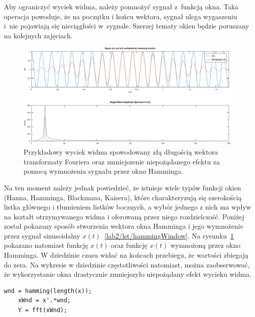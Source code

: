 Aby ograniczyć wyciek widma, należy pomnożyć sygnał z~funkcją okna. Taka operacja powoduje, że na początku i końcu wektora, sygnał ulega wygaszeniu i~nie pojawiają się nieciągłości w~sygnale. Szerzej tematy okien będzie poruszany na kolejnych zajęciach.
\begin{figure}[hbt!]
	\centering
	\includegraphics[width=0.9\linewidth]{images/spectralLeakage.png}
	\caption{Przykładowy wyciek widma spowodowany złą długością wektora transformaty Fouriera oraz zmniejszenie niepożądanego efektu za pomocą wymnożenia sygnału przez okno Hamminga.}
	\label{lab2/fig/spectralLeakage}
\end{figure}
Na ten moment należy jednak powiedzieć, że istnieje wiele typów funkcji okien (Hanna, Hamminga, Blackmana, Kaisera), które charakteryzują się szerokością listka głównego i tłumieniem listków bocznych, a wybór jednego z nich ma wpływ na kształt otrzymywanego widma i oferowaną przez niego rozdzielczość. Poniżej został pokazany sposób stworzenia wektora okna Hamminga i jego wymnożenie przez sygnał sinusoidalny $x(t)$~\ref{lab2/lst/hammingWindow}. Na rysunku~\ref{lab2/fig/spectralLeakage} pokazano natomiast funkcję $x(t)$ oraz funkcję $x(t)$ wymnożoną przez okno Hamminga. W dziedzinie czasu widać na końcach przebiegu, że wartości zbiegają do zera. Na wykresie w dziedzinie częstotliwości natomiast, można zaobserwować, że wykorzystanie okna drastycznie zmniejszyło niepożądany efekt wycieku widma.    
\begin{lstlisting}[caption=Wymnożenie sygnału $x(t)$ przez okno Hamminga , label=lab2/lst/hammingWindow]
	wnd = hamming(length(x));
	xWnd = x'.*wnd;
	Y = fft(xWnd);
\end{lstlisting}


